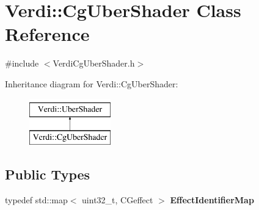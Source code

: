 \hypertarget{class_verdi_1_1_cg_uber_shader}{\section{\-Verdi\-:\-:\-Cg\-Uber\-Shader \-Class \-Reference}
\label{class_verdi_1_1_cg_uber_shader}
}


{\ttfamily \#include $<$\-Verdi\-Cg\-Uber\-Shader.\-h$>$}

\-Inheritance diagram for \-Verdi\-:\-:\-Cg\-Uber\-Shader\-:\begin{figure}[H]
\begin{center}
\leavevmode
\includegraphics[height=2.000000cm]{class_verdi_1_1_cg_uber_shader}
\end{center}
\end{figure}
\subsection*{\-Public \-Types}
\begin{DoxyCompactItemize}
\item 
\hypertarget{class_verdi_1_1_cg_uber_shader_adea16558f151a8ca4a62623ced1af8b8}{typedef std\-::map$<$ uint32\-\_\-t, \*
\-C\-Geffect $>$ {\bfseries \-Effect\-Identifier\-Map}}\label{class_verdi_1_1_cg_uber_shader_adea16558f151a8ca4a62623ced1af8b8}

\end{DoxyCompactItemize}

